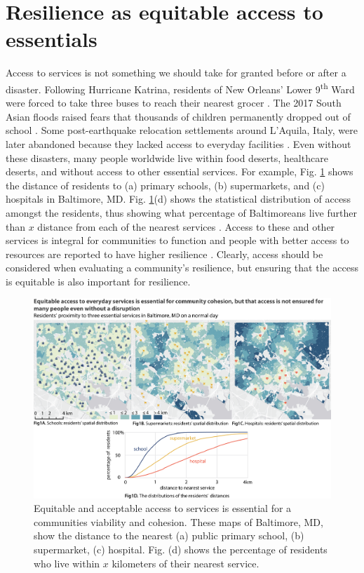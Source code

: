 \documentclass[onecolumn,doublespacing]{risa}
\let \cite \parencite
\begin{document}
\section{Resilience as equitable access to essentials}
\label{sec:eae}
Access to services is not something we should take for granted before or after a disaster. 
Following Hurricane Katrina, residents of New Orleans' Lower 9\textsuperscript{th} Ward were forced to take three buses to reach their nearest grocer \cite{Netter2016-dm}. 
The 2017 South Asian floods raised fears that thousands of children permanently dropped out of school \cite{Watt2017-bs}. 
Some post-earthquake relocation settlements around L'Aquila, Italy, were later abandoned because they lacked access to everyday facilities \cite{Contreras2017-yq}.
Even without these disasters, many people worldwide live within food deserts, healthcare deserts, and without access to other essential services. 
For example, Fig. \ref{fig:bal_services} shows the distance of residents to (a) primary schools, (b) supermarkets, and (c) hospitals in Baltimore, MD.
Fig. \ref{fig:bal_services}(d) shows the statistical distribution of access amongst the residents, thus showing what percentage of Baltimoreans live further than $x$ distance from each of the nearest services \cite{Logan2017-fr}.
Access to these and other services is integral for communities to function \cite{Winter1997-kc, Dempsey2011-og, United_Nations_Educational_Scientific_and_Cultural_Organization2018-sf} and people with better access to resources are reported to have higher resilience \cite{Frazier2013-ct}.
Clearly, access should be considered when evaluating a community's resilience, but ensuring that the access is equitable is also important for resilience.

\begin{figure}
    \centering
    \includegraphics[width=\linewidth]{report/fig/fig_bal.png}
    \caption{Equitable and acceptable access to services is essential for a communities viability and cohesion. These maps of Baltimore, MD, show the distance to the nearest (a) public primary school, (b) supermarket, (c) hospital. Fig. (d) shows the percentage of residents who live within $x$ kilometers of their nearest service.
    }
    \label{fig:bal_services}
\end{figure}
\end{document}
